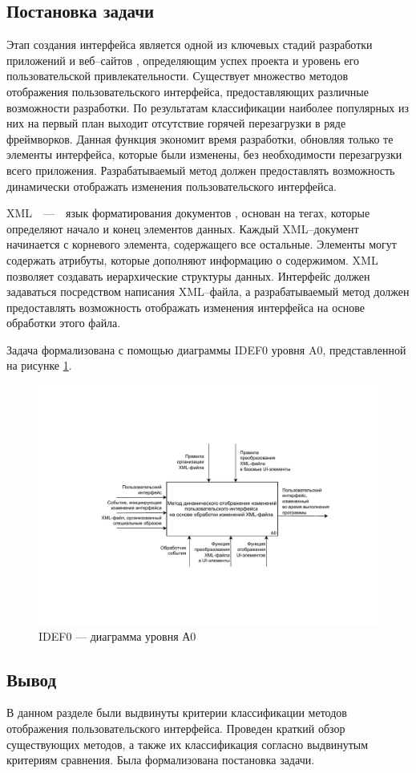 \subsection{Постановка задачи}

Этап создания интерфейса является одной из ключевых стадий разработки приложений и веб--сайтов \cite{website}, определяющим успех проекта и уровень его пользовательской привлекательности. 
Существует множество методов отображения пользовательского интерфейса, предоставляющих различные возможности разработки. 
По результатам классификации наиболее популярных из них на первый план выходит отсутствие горячей перезагрузки в ряде фреймворков.
Данная функция экономит время разработки, обновляя только те элементы интерфейса, которые были изменены, без необходимости перезагрузки всего приложения. 
Разрабатываемый метод должен предоставлять возможность динамически отображать изменения пользовательского интерфейса.

XML~~---~~язык форматирования документов \cite{xml}, основан на тегах, которые определяют начало и конец элементов данных.
Каждый XML--документ начинается с корневого элемента, содержащего все остальные. 
Элементы могут содержать атрибуты, которые дополняют информацию о содержимом. 
XML позволяет создавать иерархические структуры данных.
Интерфейс должен задаваться посредством написания XML--файла, а разрабатываемый метод должен предоставлять возможность отображать изменения интерфейса на основе обработки этого файла.

Задача формализована с помощью диаграммы IDEF0 уровня A0, представленной на рисунке  \ref{fig:idef0}.

\begin{figure}[!htb]
	\centering
	\includegraphics[scale=0.9]{img/A0.pdf}
	\caption{IDEF0 --- диаграмма уровня А0}
	\label{fig:idef0}
\end{figure}

\subsection*{Вывод}

В данном разделе были выдвинуты критерии классификации методов отображения пользовательского интерфейса.
Проведен краткий обзор существующих методов, а также их классификация согласно выдвинутым критериям сравнения. 
Была формализована постановка задачи.

\pagebreak
